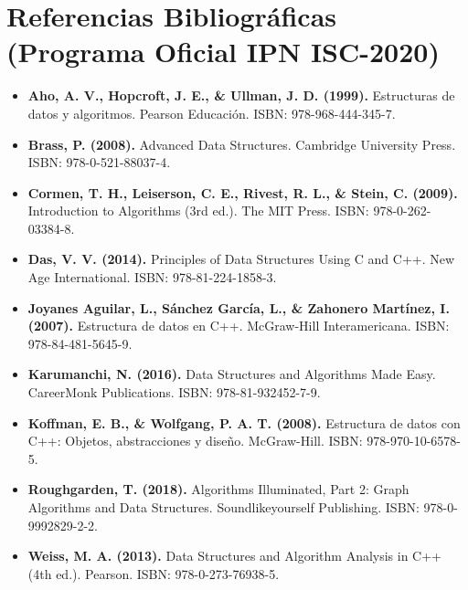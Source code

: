 \documentclass[11pt,letterpaper]{article}
\begin{document}
\section*{Referencias Bibliográficas (Programa Oficial IPN ISC-2020)}
\begin{itemize}
\setlength{\itemsep}{2pt}\setlength{\parskip}{0pt}
  \item \textbf{Aho, A. V., Hopcroft, J. E., \& Ullman, J. D. (1999). }Estructuras de datos y algoritmos. Pearson Educación. ISBN: 978-968-444-345-7.
  \item \textbf{Brass, P. (2008). }Advanced Data Structures. Cambridge University Press. ISBN: 978-0-521-88037-4.
  \item \textbf{Cormen, T. H., Leiserson, C. E., Rivest, R. L., \& Stein, C. (2009). }Introduction to Algorithms (3rd ed.). The MIT Press. ISBN: 978-0-262-03384-8.
  \item \textbf{Das, V. V. (2014). }Principles of Data Structures Using C and C++. New Age International. ISBN: 978-81-224-1858-3.
  \item \textbf{Joyanes Aguilar, L., Sánchez García, L., \& Zahonero Martínez, I. (2007). }Estructura de datos en C++. McGraw-Hill Interamericana. ISBN: 978-84-481-5645-9.
  \item \textbf{Karumanchi, N. (2016). }Data Structures and Algorithms Made Easy. CareerMonk Publications. ISBN: 978-81-932452-7-9.
  \item \textbf{Koffman, E. B., \& Wolfgang, P. A. T. (2008). }Estructura de datos con C++: Objetos, abstracciones y diseño. McGraw-Hill. ISBN: 978-970-10-6578-5.
  \item \textbf{Roughgarden, T. (2018). }Algorithms Illuminated, Part 2: Graph Algorithms and Data Structures. Soundlikeyourself Publishing. ISBN: 978-0-9992829-2-2.
  \item \textbf{Weiss, M. A. (2013). }Data Structures and Algorithm Analysis in C++ (4th ed.). Pearson. ISBN: 978-0-273-76938-5.
\end{itemize}
\end{document}

